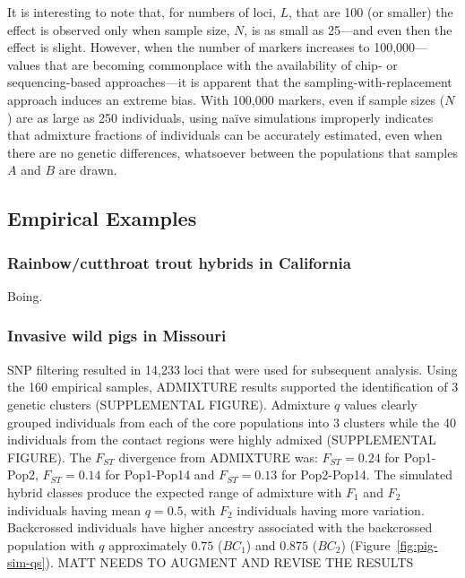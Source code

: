 {\begin{figure}
\caption[\biassimscap]{\biassimscap}
\label{fig:bias-sims}
\end{figure}
It is interesting to note
that, for numbers of loci,  $L$, that are 100 (or smaller) the effect is observed only when
sample size, $N$, is as small as 25---and even then the effect is slight.  However, when the
number of markers increases to 100,000---values that are becoming commonplace with the availability of chip-
or sequencing-based approaches---it is apparent that the sampling-with-replacement approach
induces an extreme bias.  With 100,000 markers, even if sample sizes ($N$) are as large as 250 individuals,
using na\"{i}ve simulations improperly indicates that admixture fractions of individuals can be
accurately estimated, even when there are no genetic differences, whatsoever between the populations that
samples $A$ and $B$ are drawn.

\subsection*{Empirical Examples}

\subsubsection*{Rainbow/cutthroat trout hybrids in California}

Boing.

\subsubsection*{Invasive wild pigs in Missouri}

SNP filtering resulted in 14,233 loci that were used for subsequent analysis.
Using the 160 empirical samples, ADMIXTURE results supported the identification of
3 genetic clusters (SUPPLEMENTAL FIGURE). Admixture $q$ values clearly grouped individuals
from each of the core populations into 3 clusters while the 40 individuals from the contact regions were
highly admixed (SUPPLEMENTAL FIGURE). The
$F_{ST}$ divergence from ADMIXTURE was:
$F_{ST} = 0.24$ for Pop1-Pop2,
$F_{ST} = 0.14$ for Pop1-Pop14 and
$F_{ST} = 0.13$ for Pop2-Pop14. The simulated hybrid classes produce
the expected range of admixture with $F_1$ and $F_2$ individuals having mean $q=0.5$, with $F_2$ individuals having
more variation. Backcrossed individuals have higher ancestry associated with the backcrossed population with $q$
approximately $0.75$ ($BC_1$) and $0.875$ ($BC_2$) (Figure~\ref{fig:pig-sim-qs}). MATT NEEDS TO AUGMENT AND 
REVISE THE RESULTS



}
